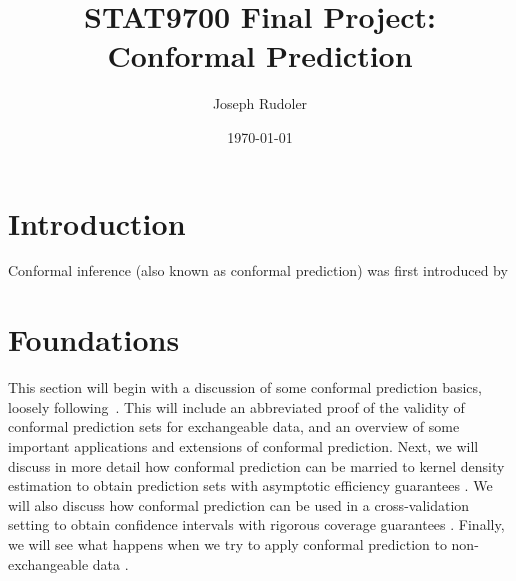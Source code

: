 \documentclass[a4paper, 12pt]{article}
\title{STAT9700 Final Project: Conformal Prediction}
\author{Joseph Rudoler}
\date{\today}
\begin{document}
\maketitle


\section*{Introduction}
Conformal inference (also known as conformal prediction) was first introduced by \textcite{vovkMachineLearningApplicationsAlgorithmic1999}

\section*{Foundations}
This section will begin with a discussion of some conformal prediction basics,
loosely following~\cite{angelopoulosGentleIntroductionConformal2022}.
This will include an abbreviated proof of the validity of conformal prediction sets for exchangeable data,
and an overview of some important applications and extensions of conformal prediction.
Next, we will discuss in more detail how conformal prediction can be married to
kernel density estimation to obtain prediction sets with asymptotic efficiency
guarantees \autocite{leiDistributionFreePrediction2013}. We will also discuss
how conformal prediction can be used in a cross-validation setting to obtain confidence
intervals with rigorous coverage guarantees \autocite{barberPredictiveInferenceJackknife2020}.
Finally, we will see what happens when we try to apply conformal prediction to
non-exchangeable data \autocite{barberConformalPredictionExchangeability2023}.
\end{document}
